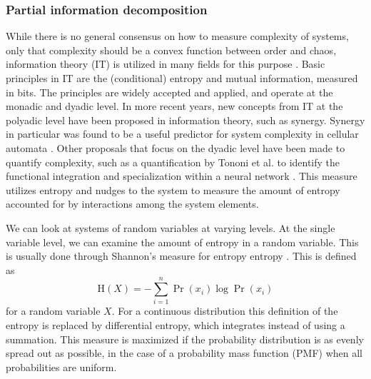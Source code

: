 \documentclass[../main.tex]{subfiles}
\begin{document}
\subsubsection{Partial information decomposition}

While there is no general consensus on how to measure complexity of systems, only that complexity should be a convex function between order and chaos, information theory (IT) is utilized in many fields for this purpose \cite{bar2013computationally, williams2010nonnegative}. %
Basic principles in IT are the (conditional) entropy and mutual information, measured in bits.
The principles are widely accepted and applied, and operate at the monadic and dyadic level.
In more recent years, new concepts from IT at the polyadic level have been proposed in information theory, such as synergy.
Synergy in particular was found to be a useful predictor for system complexity in cellular automata \cite{9999QuaxChli}.
Other proposals that focus on the dyadic level have been made to quantify complexity, such as a quantification by Tononi et al. to identify the functional integration and specialization within a neural network \cite{tononi1999measures}.
This measure utilizes entropy and nudges to the system to measure the amount of entropy accounted for by interactions among the system elements.


We can look at systems of random variables at varying levels.
At the single variable level, we can examine the amount of entropy in a random variable.
This is usually done through Shannon's measure for entropy entropy \cite{shannon1949mathematical}.
This is defined as
%
\begin{equation}
\mathrm{H}\left( X \right) = -\sum^n_{i=1} \Pr \left( x_i \right ) \log \Pr \left( x_i \right)
\end{equation}
%
for a random variable $X$.
For a continuous distribution this definition of the entropy is replaced by differential entropy, which integrates instead of using a summation.
This measure is maximized if the probability distribution is as evenly spread out as possible, in the case of a probability mass function (PMF) when all probabilities are uniform.
\end{document}
